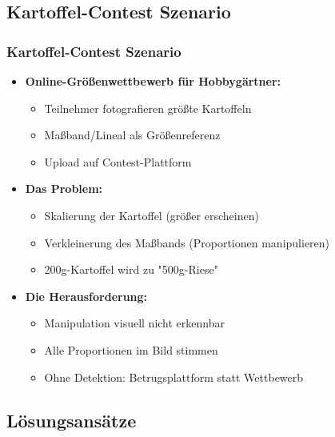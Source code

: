 \documentclass[11pt,t,usepdftitle=false,aspectratio=169]{beamer}
\begin{document}
\subsection{Kartoffel-Contest Szenario}

\begin{frame}
	\frametitle{Kartoffel-Contest Szenario}
	\begin{itemize}
		\item \textbf{Online-Größenwettbewerb für Hobbygärtner:} 
		\begin{itemize}
			\item Teilnehmer fotografieren größte Kartoffeln
			\item Maßband/Lineal als Größenreferenz
			\item Upload auf Contest-Plattform
		\end{itemize}
		\item \textbf{Das Problem:} 
		\begin{itemize}
			\item Skalierung der Kartoffel (größer erscheinen)
			\item Verkleinerung des Maßbands (Proportionen manipulieren)
			\item 200g-Kartoffel wird zu "500g-Riese"
		\end{itemize}
		\item \textbf{Die Herausforderung:} 
		\begin{itemize}
			\item Manipulation visuell nicht erkennbar
			\item Alle Proportionen im Bild stimmen
			\item Ohne Detektion: Betrugsplattform statt Wettbewerb
		\end{itemize}
	\end{itemize}
\end{frame}

\subsection{Lösungsansätze}
\end{document}
